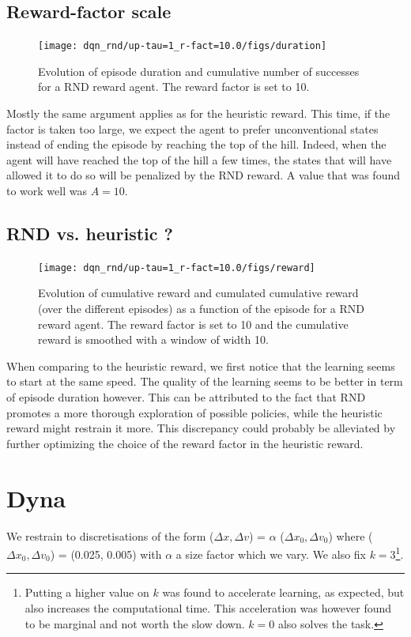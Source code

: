 \documentclass[a4paper, 12pt,oneside]{article}
\begin{document}
        \subsection{Reward-factor scale}
        \begin{figure}
            \centering
            \vspace{-2em}
            \texttt{[image: dqn\_rnd/up-tau=1\_r-fact=10.0/figs/duration]}
        \caption{Evolution of episode duration and cumulative number of successes for a RND reward agent. The reward factor is set to 10.}
        \label{fig:dqn-rnd-r-fact10-duration}
        \end{figure}
        Mostly the same argument applies as for the heuristic reward. This time, if the factor is taken too large, we expect the agent to prefer unconventional states instead of ending the episode by reaching the top of the hill. Indeed, when the agent will have reached the top of the hill a few times, the states that will have allowed it to do so will be penalized by the RND reward. A value that was found to work well was $A=10$.
        \subsection{RND vs. heuristic ?}
            \begin{figure}
                \centering
                \vspace{-3em}
                \texttt{[image: dqn\_rnd/up-tau=1\_r-fact=10.0/figs/reward]}
            \caption{Evolution of cumulative reward and cumulated cumulative reward (over the different episodes) as a function of the episode for a RND reward agent. The reward factor is set to 10 and the cumulative reward is smoothed with a window of width 10.}
            \label{fig:dqn-rnd-r-fact=10-reward}
            \end{figure}
        When comparing to the heuristic reward, we first notice that the learning seems to start at the same speed. The quality of the learning seems to be better in term of episode duration however. This can be attributed to the fact that RND promotes a more thorough exploration of possible policies, while the heuristic reward might restrain it more. This discrepancy could probably be alleviated by further optimizing the choice of the reward factor in the heuristic reward.
        \section{Dyna}
        We restrain to discretisations of the form ($\Delta x, \Delta v$) = $\alpha$ ($\Delta x_0, \Delta v_0$) where ($\Delta x_0, \Delta v_0$) = (0.025, 0.005) with $\alpha$ a size factor which we vary. We also fix $k=3$\footnote{Putting a higher value on $k$ was found to accelerate learning, as expected, but also increases the computational time. This acceleration was however found to be marginal and not worth the slow down. $k=0$ also solves the task.}. 
\end{document}
